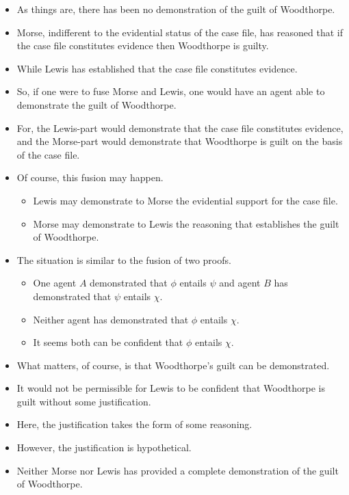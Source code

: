 \documentclass[10pt]{article}
\begin{document}
\begin{itemize}
\item As things are, there has been no demonstration of the guilt of Woodthorpe.
\item Morse, indifferent to the evidential status of the case file, has reasoned that if the case file constitutes evidence then Woodthorpe is guilty.
\item While Lewis has established that the case file constitutes evidence.
\item So, if one were to fuse Morse and Lewis, one would have an agent able to demonstrate the guilt of Woodthorpe.
\item For, the Lewis-part would demonstrate that the case file constitutes evidence, and the Morse-part would demonstrate that Woodthorpe is guilt on the basis of the case file.
\item Of course, this fusion may happen.
  \begin{itemize}
  \item Lewis may demonstrate to Morse the evidential support for the case file.
  \item Morse may demonstrate to Lewis the reasoning that establishes the guilt of Woodthorpe.
  \end{itemize}
\item The situation is similar to the fusion of two proofs.
  \begin{itemize}
  \item One agent \(A\) demonstrated that \(\phi\) entails \(\psi\) and agent \(B\) has demonstrated that \(\psi\) entails \(\chi\).
  \item Neither agent has demonstrated that \(\phi\) entails \(\chi\).
  \item It seems both can be confident that \(\phi\) entails \(\chi\).
  \end{itemize}
\end{itemize}

\begin{itemize}
\item What matters, of course, is that Woodthorpe's guilt can be demonstrated.
\item It would not be permissible for Lewis to be confident that Woodthorpe is guilt without some justification.
\item Here, the justification takes the form of some reasoning.
\item However, the justification is hypothetical.
\item Neither Morse nor Lewis has provided a complete demonstration of the guilt of Woodthorpe.
\end{itemize}
\end{document}
